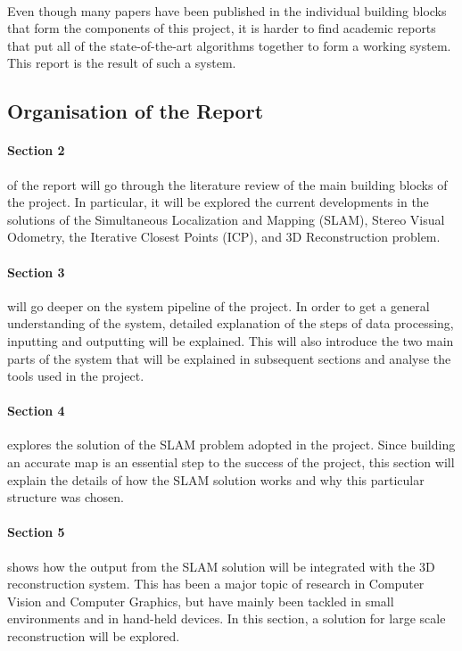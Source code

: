 \documentclass[12pt]{article}
\begin{document}
	\paragraph{}
	Even though many papers have been published in the individual building blocks that form the components of this project, it is harder to find academic reports that put all of the state-of-the-art algorithms together to form a working system. This report is the result of such a system.
	
	\subsection{ Organisation of the Report}
		\paragraph{Section 2} of the report will go through the literature review of the main building blocks of the project. In particular, it will be explored the current developments in the solutions of the Simultaneous Localization and Mapping (SLAM), Stereo Visual Odometry, the Iterative Closest Points (ICP), and 3D Reconstruction problem.
		
		\paragraph{Section 3} will go deeper on the system pipeline of the project. In order to get a general understanding of the system, detailed explanation of the steps of data processing, inputting and outputting will be explained. This will also introduce the two main parts of the system that will be explained in subsequent sections and analyse the tools used in the project.
		
		\paragraph{Section 4} explores the solution of the SLAM problem adopted in the project. Since building an accurate map is an essential step to the success of the project, this section will explain the details of how the SLAM solution works and why this particular structure was chosen.
		
		\paragraph{Section 5} shows how the output from the SLAM solution will be integrated with the 3D reconstruction system. This has been a major topic of research in Computer Vision and Computer Graphics, but have mainly been tackled in small environments and in hand-held devices. In this section, a solution for large scale reconstruction will be explored.
		
\end{document}
